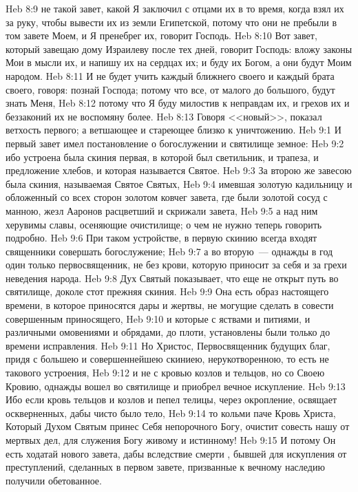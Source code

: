 \vs Heb 8:9 не такой завет, какой Я заключил с отцами их в то время, когда взял их за руку, чтобы вывести их из земли Египетской, потому что они не пребыли в том завете Моем, и Я пренебрег их, говорит Господь.
\vs Heb 8:10 Вот завет, который завещаю дому Израилеву после тех дней, говорит Господь: вложу законы Мои в мысли их, и напишу их на сердцах их; и буду их Богом, а они будут Моим народом.
\vs Heb 8:11 И не будет учить каждый ближнего своего и каждый брата своего, говоря: познай Господа; потому что все, от малого до большого, будут знать Меня,
\vs Heb 8:12 потому что Я буду милостив к неправдам их, и грехов их и беззаконий их не воспомяну более.
\vs Heb 8:13 Говоря <<новый>>, показал ветхость первого; а ветшающее и стареющее близко к уничтожению.
\vs Heb 9:1 И первый завет имел постановление о богослужении и святилище земное:
\vs Heb 9:2 ибо устроена была скиния первая, в которой был светильник, и трапеза, и предложение хлебов, и которая называется Святое.
\vs Heb 9:3 За второю же завесою была скиния, называемая Святое Святых,
\vs Heb 9:4 имевшая золотую кадильницу и обложенный со всех сторон золотом ковчег завета, где были золотой сосуд с манною, жезл Ааронов расцветший и скрижали завета,
\vs Heb 9:5 а над ним херувимы славы, осеняющие очистилище; о чем не нужно теперь говорить подробно.
\vs Heb 9:6 При таком устройстве, в первую скинию всегда входят священники совершать богослужение;
\vs Heb 9:7 а во вторую~--- однажды в год один только первосвященник, не без крови, которую приносит за себя и за грехи неведения народа.
\vs Heb 9:8  Дух Святый показывает, что еще не открыт путь во святилище, доколе стот прежняя скиния.
\vs Heb 9:9 Она есть образ настоящего времени, в которое приносятся дары и жертвы, не могущие сделать в совести совершенным приносящего,
\vs Heb 9:10 и которые с яствами и питиями, и различными омовениями и обрядами,  до плоти, установлены были только до времени исправления.
\rsbpar\vs Heb 9:11 Но Христос, Первосвященник будущих благ, придя с большею и совершеннейшею скиниею, нерукотворенною, то есть не такового устроения,
\vs Heb 9:12 и не с кровью козлов и тельцов, но со Своею Кровию, однажды вошел во святилище и приобрел вечное искупление.
\vs Heb 9:13 Ибо если кровь тельцов и козлов и пепел телицы, через окропление, освящает оскверненных, дабы чисто было тело,
\vs Heb 9:14 то кольми паче Кровь Христа, Который Духом Святым принес Себя непорочного Богу, очистит совесть нашу от мертвых дел, для служения Богу живому и истинному!
\vs Heb 9:15 И потому Он есть ходатай нового завета, дабы вследствие смерти , бывшей для искупления от преступлений, сделанных в первом завете, призванные к вечному наследию получили обетованное.
